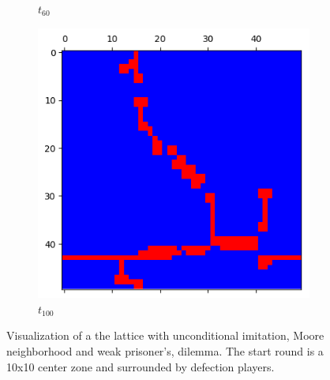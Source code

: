 \documentclass[letterpaper]{article}
\begin{document}
\begin{figure}[H]
\begin{subfigure}{.33\textwidth}
      \caption{$t_{60}$}
    \end{subfigure}
    \begin{subfigure}{.33\textwidth}
      \centering
      \includegraphics[width=1\linewidth]{images/assign2/part31-defect/t100}
      \caption{$t_{100}$}
    \end{subfigure}
    \caption{Visualization of a the lattice with unconditional imitation,
    Moore neighborhood and weak prisoner's, dilemma. The start round is
    a 10x10 center zone and surrounded by defection players.}
    \label{fig:visupart31-defect}
\end{figure}
\end{document}
